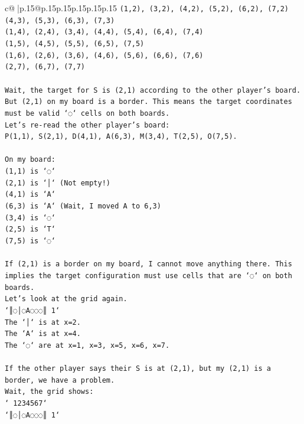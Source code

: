 \documentclass{article}
\begin{document}
{\begin{supertabular}{c@{$\;$}|p{.15\linewidth}@{}p{.15\linewidth}p{.15\linewidth}p{.15\linewidth}p{.15\linewidth}p{.15\linewidth}}
{{{\texttt{(1,2), (3,2), (4,2), (5,2), (6,2), (7,2)} \\
\texttt{(4,3), (5,3), (6,3), (7,3)} \\
\texttt{(1,4), (2,4), (3,4), (4,4), (5,4), (6,4), (7,4)} \\
\texttt{(1,5), (4,5), (5,5), (6,5), (7,5)} \\
\texttt{(1,6), (2,6), (3,6), (4,6), (5,6), (6,6), (7,6)} \\
\texttt{(2,7), (6,7), (7,7)} \\
\\ 
\texttt{Wait, the target for S is (2,1) according to the other player's board. But (2,1) on my board is a border. This means the target coordinates must be valid `◌` cells on both boards.} \\
\texttt{Let's re{-}read the other player's board:} \\
\texttt{P(1,1), S(2,1), D(4,1), A(6,3), M(3,4), T(2,5), O(7,5).} \\
\\ 
\texttt{On my board:} \\
\texttt{(1,1) is `◌`} \\
\texttt{(2,1) is `│` (Not empty!)} \\
\texttt{(4,1) is `A`} \\
\texttt{(6,3) is `A` (Wait, I moved A to 6,3)} \\
\texttt{(3,4) is `◌`} \\
\texttt{(2,5) is `T`} \\
\texttt{(7,5) is `◌`} \\
\\ 
\texttt{If (2,1) is a border on my board, I cannot move anything there. This implies the target configuration must use cells that are `◌` on both boards.} \\
\texttt{Let's look at the grid again.} \\
\texttt{`║◌│◌A◌◌◌║ 1`} \\
\texttt{The `│` is at x=2.} \\
\texttt{The `A` is at x=4.} \\
\texttt{The `◌` are at x=1, x=3, x=5, x=6, x=7.} \\
\\ 
\texttt{If the other player says their S is at (2,1), but my (2,1) is a border, we have a problem.} \\
\texttt{Wait, the grid shows:} \\
\texttt{` 1234567`} \\
\texttt{`║◌│◌A◌◌◌║ 1`} \\
}}}
\end{supertabular}}
\end{document}

